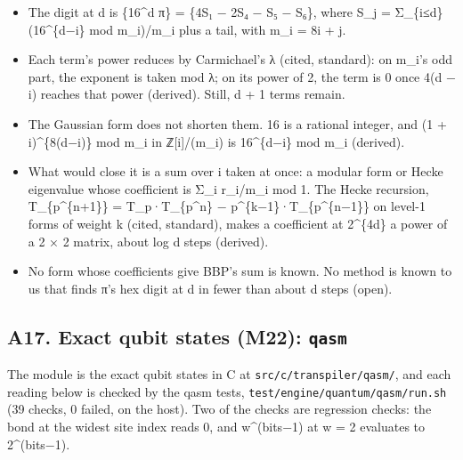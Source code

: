 \begin{itemize}
\begin{itemize}
\item The digit at d is \{16\textasciicircum{}d π\} = \{4S₁ − 2S₄ − S₅ − S₆\}, where S\_\allowbreak{}j = Σ\_\allowbreak{}\{i≤d\} (16\textasciicircum{}\{d−i\} mod m\_\allowbreak{}i)/m\_\allowbreak{}i plus a tail, with m\_\allowbreak{}i = 8i + j.
\item Each term's power reduces by Carmichael's λ (cited, standard): on m\_\allowbreak{}i's odd part, the exponent is taken mod λ; on its power of 2, the term is 0 once 4(d − i) reaches that power (derived). Still, d + 1 terms remain.
\item The Gaussian form does not shorten them. 16 is a rational integer, and (1 + i)\textasciicircum{}\{8(d−i)\} mod m\_\allowbreak{}i in ℤ[i]/(m\_\allowbreak{}i) is 16\textasciicircum{}\{d−i\} mod m\_\allowbreak{}i (derived).
\item What would close it is a sum over i taken at once: a modular form or Hecke eigenvalue whose coefficient is Σ\_\allowbreak{}i r\_\allowbreak{}i/m\_\allowbreak{}i mod 1. The Hecke recursion, T\_\allowbreak{}\{p\textasciicircum{}\{n+1\}\} = T\_\allowbreak{}p·T\_\allowbreak{}\{p\textasciicircum{}n\} − p\textasciicircum{}\{k−1\}·T\_\allowbreak{}\{p\textasciicircum{}\{n−1\}\} on level-1 forms of weight k (cited, standard), makes a coefficient at 2\textasciicircum{}\{4d\} a power of a 2 × 2 matrix, about log d steps (derived).
\item No form whose coefficients give BBP's sum is known. No method is known to us that finds π's hex digit at d in fewer than about d steps (open).
\end{itemize}
\end{itemize}

\subsection{\texorpdfstring{A17. Exact qubit states (M22): \texttt{qasm}}{A17. Exact qubit states (M22): qasm}}

The module is the exact qubit states in C at \texttt{src/\allowbreak{}c/\allowbreak{}transpiler/\allowbreak{}qasm/\allowbreak{}}, and each reading below is checked by the qasm tests, \texttt{test/\allowbreak{}engine/\allowbreak{}quantum/\allowbreak{}qasm/\allowbreak{}run.\allowbreak{}sh} (39 checks, 0 failed, on the host). Two of the checks are regression checks: the bond at the widest site index reads 0, and w\textasciicircum{}(bits−1) at w = 2 evaluates to 2\textasciicircum{}(bits−1).

